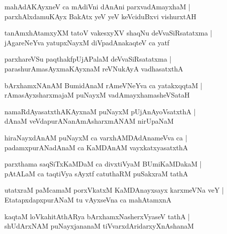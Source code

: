 \documentclass[twoside,12pt,openright]{book}
\newcounter{shloka}[chapter]
\begin{document}
\begin{shloka}%
mahAdAKAyxneV ca mAdiVni dAnAni parxvadAmayxhaM |\\
parxhAlxdamuKAyx BakAtx yeV yeV keVciduBxvi vishurxtAH 
\end{shloka}

\begin{shloka}%
tanAmxhAtamxyXM tatoV vakesxyXV shaqNu deVvaSiRsatatxma |\\
jAgareNeYva yatupxNayxM diVpadAnakaqteV ca yatf 
\end{shloka}

\begin{shloka}%
parxhareVSu paqthakfpUjAPalaM deVvaSiRsatatxma |\\
parashurAmasAyxmaKAyxnaM reVNukAyA vadhasatxthA 
\end{shloka}

\begin{shloka}%
bArxhamxNAnAM BumidAnaM rAmeVNeYva ca yatakxqqtaM |\\
rAmasAyxsharxmajaM puNayxM vadAmayxhamasheVSataH 
\end{shloka}

\begin{shloka}%
namaRdAyasatxthAKAyxnaM puNayxM pUjAnAyoVsatxthA |\\
dAnaM veVdapurANanAmAsharxmANAM nirUpaNaM 
\end{shloka}

\begin{shloka}%
hiraNayxdAnAM puNayxM ca varxhAMDAdAnameVva ca |\\
padamxpurANadAnaM ca KaMDAnAM vayxkatxyasatxthA 
\end{shloka}

\begin{shloka}%
parxthama saqSiTxKaMDaM ca divxtiVyaM BUmiKaMDakaM |\\
pAtALaM ca taqtiVya sAyxtf catuthaRM puSakxraM tathA 
\end{shloka}

\begin{shloka}%
utatxraM paMcamaM porxVkatxM KaMDAnayxsayx karxmeVNa veY |\\
EtatapxdapxpurANaM tu vAyxseVna ca mahAtamxnA 
\end{shloka}

\begin{shloka}%
kaqtaM loVkahitAthARya bArxhamxNasherxVyaseV tathA |\\
shUdArxNAM puNayxjananaM tiVvarxdAridarxyXnAshanaM
\end{shloka}
\end{document}
